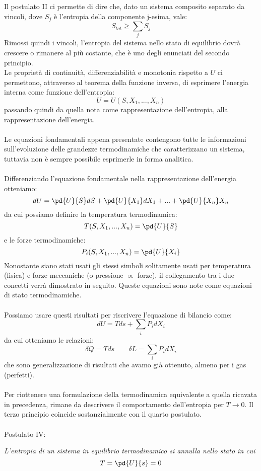 \documentclass{article}
\begin{document}
Il postulato II ci permette di dire che, dato un sistema composito separato da vincoli, dove $S_j$ è l'entropia della componente j-esima, vale:
$$ S_{tot}\geq \sum_jS_j $$
Rimossi quindi i vincoli, l'entropia del sistema nello stato di equilibrio dovrà crescere o rimanere al più costante, che è uno degli enunciati del secondo principio.\\
Le proprietà di continuità, differenziabilità e monotonia rispetto a $U$ ci permettono, attraverso al teorema della funzione inversa, di esprimere l'energia interna come funzione dell'entropia:
$$ U = U(S, X_1, ..., X_n) $$
passando quindi da quella nota come rappresentazione dell'entropia, alla rappresentazione dell'energia.\\\\
Le equazioni fondamentali appena presentate contengono tutte le informazioni sull'evoluzione delle grandezze termodinamiche che caratterizzano un sistema, tuttavia non è sempre possibile esprimerle in forma analitica.\\\\
Differenziando l'equazione fondamentale nella rappresentazione dell'energia otteniamo:
$$ dU = \pd{U}{S}dS+\pd{U}{X_1}dX_1+...+\pd{U}{X_n}X_n $$
da cui possiamo definire la temperatura termodinamica:
$$ T(S, X_1, ..., X_n) = \pd{U}{S} $$
e le forze termodinamiche:
$$ P_i(S, X_1, ..., X_n) = \pd{U}{X_i} $$ 
Nonostante siano stati usati gli stessi simboli solitamente usati per temperatura (fisica) e forze meccaniche (o pressione $\propto$ forze), il collegamento tra i due concetti verrà dimostrato in seguito.
Queste equazioni sono note come equazioni di stato termodinamiche.\\\\
Possiamo usare questi risultati per riscrivere l'equazione di bilancio come:
$$ dU=Tds+\sum_iP_idX_i $$
da cui otteniamo le relazioni:
$$ \delta Q = Tds \qquad \delta L = \sum_iP_idX_i $$
che sono generalizzazione di risultati che avamo già ottenuto, almeno per i gas (perfetti).\\\\
Per riottenere una formulazione della termodinamica equivalente a quella ricavata in precedenza, rimane da descrivere il comportamento dell'entropia per $T\rightarrow0$. Il terzo principio coincide sostanzialmente con il quarto postulato.\\\\
Postulato IV:
\begin{center}
    \textit{L'entropia di un sistema in equilibrio termodinamico si annulla nello stato in cui
    $$ T = \pd{U}{s}=0 $$}
\end{center}











\Index
\end{document}
